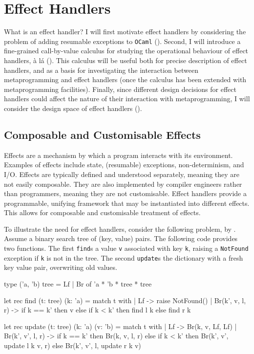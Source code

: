 \section{Effect Handlers}\label{section:effects-technical}
What is an effect handler? I will first motivate effect handlers by considering the problem of adding resumable exceptions to \texttt{OCaml} (). Second, I will introduce a fine-grained call-by-value calculus for studying the operational behaviour of effect handlers, à lá \citet{pretnar-15} (). This calculus will be useful both for precise description of effect handlers, and as a basis for investigating the interaction between metaprogramming and effect handlers (once the calculus has been extended with metaprogramming facilities). Finally, since different design decisions for effect handlers could affect the nature of their interaction with metaprogramming, I will consider the design space of effect handlers ().

\subsection{Composable and Customisable Effects}\label{subsection:effect-handler-motivation}
Effects are a mechanism by which a program interacts with its environment. Examples of effects include state, (resumable) exceptions, non-determinism, and I/O. Effects are typically defined and understood separately, meaning they are not easily composable. They are also implemented by compiler engineers rather than programmers, meaning they are not customisable. Effect handlers provide a programmable, unifying framework that may be instantiated into different effects. This allows for composable and customisable treatment of effects.

To illustrate the need for effect handlers, consider the following problem, by \citet{kiselyov-2012}. Assume a binary search tree of (key, value) pairs. The following code provides two functions. The first \texttt{find}s a value \texttt{v} associated with key \texttt{k}, raising a \texttt{NotFound} exception if \texttt{k} is not in the tree. The second \texttt{update}s the dictionary with a fresh key value pair, overwriting old values.

\begin{ocaml}
type ('a, 'b) tree = Lf | Br of 'a * 'b * tree * tree 

let rec find (t: tree) (k: 'a) = match t with 
 | Lf -> raise NotFound()
 | Br(k', v, l, r) -> if k == k' then v 
                      else if k < k' then find l k
                           else find r k

let rec update (t: tree) (k: 'a) (v: 'b) = match t with 
  | Lf -> Br(k, v, Lf, Lf)
  | Br(k', v', l, r) -> if k == k' then Br(k, v, l, r)
                       else if k < k' then Br(k', v', update l k v, r)
                            else Br(k', v', l, update r k v)
\end{ocaml}

